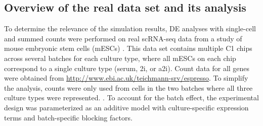 \documentclass[oupdraft]{bio}
\begin{document}
\subsection{Overview of the real data set and its analysis}
To determine the relevance of the simulation results, DE analyses with single-cell and summed counts were performed on real scRNA-seq data from a study of mouse embryonic stem cells (mESCs)  \citep{kolod2015single}.
This data set contains multiple C1 chips across several batches for each culture type, where all mESCs on each chip correspond to a single culture type (serum, 2i, or a2i). 
Count data for all genes were obtained from \url{http://www.ebi.ac.uk/teichmann-srv/espresso}.
To simplify the analysis, counts were only used from cells in the two batches where all three culture types were represented.
.
To account for the batch effect, the experimental design was parameterized as an additive model with culture-specific expression terms and batch-specific blocking factors.


\end{document}

